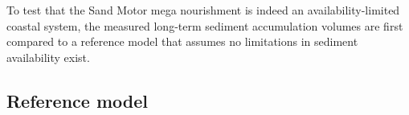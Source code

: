 To test that the Sand Motor mega nourishment is indeed an
availability-limited coastal system, the measured long-term sediment
accumulation volumes \citep{Hoonhout2017a} are first compared to a
reference model that assumes no limitations in sediment availability
exist.

%


\subsection{Reference model}

